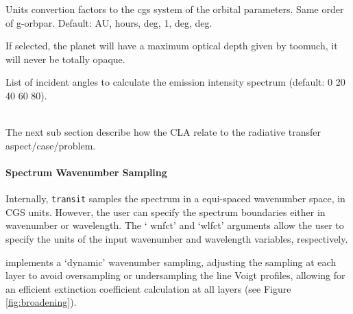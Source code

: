\documentclass[letterpaper, 12pt]{article}
\begin{document}

 \newline
{}


{Units convertion factors to the cgs system of the orbital
  parameters. Same order of g-orbpar.  Default: AU, hours, deg, 1,
  deg, deg.}

 {If selected, the planet will have a maximum
  optical depth given by toomuch, it will never be totally opaque.}

 {List of incident angles to
  calculate the emission intensity spectrum (default: 0 20 40 60 80).}


 \\
The next sub section describe how the CLA relate to the radiative
transfer aspect/case/problem.

\paragraph{Spectrum Wavenumber Sampling}

Internally, {\tt transit} samples the spectrum in a equi-spaced
wavenumber space, in CGS units.  However, the user can specify the
spectrum boundaries either in wavenumber or wavelength.  The `{\tttb
  wnfct}' and `{\tttb wlfct}' arguments allow the user to specify the
units of the input wavenumber and wavelength variables, respectively.

{\transit} implements a `dynamic' wavenumber sampling, adjusting the
sampling at each layer to avoid oversampling or undersampling the line
Voigt profiles, allowing for an efficient extinction coefficient
calculation at all layers (see Figure \ref{fig:broadening}).
\end{document}
